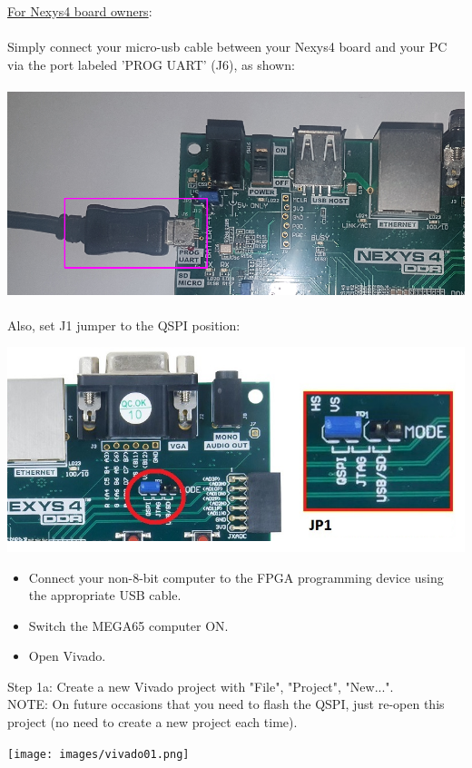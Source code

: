 \begin{tcolorbox}[colback=white,coltext=black]
\underline{For Nexys4 board owners}: \\
\\
  Simply connect your micro-usb cable between your Nexys4 board and your PC via the port labeled 'PROG UART' (J6), as shown: \\
\\
\includegraphics[width=\linewidth]{images/nexys4_comms.png}
\\
\\
Also, set J1 jumper to the QSPI position:
\\
\begin{center}
  \includegraphics[width=0.8\linewidth]{images/nexys4_j2.png}
\end{center}

\end{tcolorbox}

\begin{itemize}
  \item Connect your non-8-bit computer to the FPGA programming device using the appropriate USB cable.
  \item Switch the MEGA65 computer ON.
  \item Open Vivado.
\end{itemize}


\begin{minipage}{\linewidth}
  Step 1a: Create a new Vivado project with "File", "Project", "New...". \\
  NOTE: On future occasions that you need to flash the QSPI, just re-open this project (no need to create a new project each time).  \\
  \begin{center}
    \texttt{[image: images/vivado01.png]}
  \end{center}
\end{minipage}

